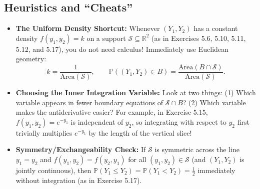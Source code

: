\documentclass[11pt, letterpaper]{article}
\theoremstyle{definition}
\theoremstyle{remark}
\begin{document}
\begin{center}
\end{center}

\subsection{Heuristics and ``Cheats''}

\begin{itemize}
    \item \textbf{The Uniform Density Shortcut:} Whenever $(Y_1, Y_2)$ has a constant density $f(y_1, y_2) = k$ on a support $\mathcal{S} \subseteq \mathbb{R}^2$ (as in Exercises 5.6, 5.10, 5.11, 5.12, and 5.17), you do not need calculus! Immediately use Euclidean geometry:
    \[
        k = \frac{1}{\text{Area}(\mathcal{S})}, \qquad \mathbb{P}((Y_1, Y_2) \in B) = \frac{\text{Area}(B \cap \mathcal{S})}{\text{Area}(\mathcal{S})}.
    \]
    \item \textbf{Choosing the Inner Integration Variable:} Look at two things: (1) Which variable appears in fewer boundary equations of $\mathcal{S} \cap B$? (2) Which variable makes the antiderivative easier? For example, in Exercise 5.15, $f(y_1, y_2) = e^{-y_1}$ is independent of $y_2$, so integrating with respect to $y_2$ first trivially multiplies $e^{-y_1}$ by the length of the vertical slice!
    \item \textbf{Symmetry/Exchangeability Check:} If $\mathcal{S}$ is symmetric across the line $y_1 = y_2$ and $f(y_1, y_2) = f(y_2, y_1)$ for all $(y_1, y_2) \in \mathcal{S}$ (and $(Y_1, Y_2)$ is jointly continuous), then $\mathbb{P}(Y_1 \le Y_2) = \mathbb{P}(Y_1 < Y_2) = \frac{1}{2}$ immediately without integration (as in Exercise 5.17).
\end{itemize}
\end{document}
